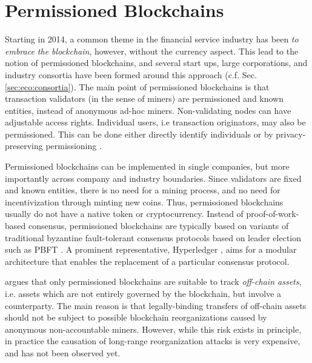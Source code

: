 \section{Permissioned Blockchains}

Starting in 2014, a common theme in the financial service industry has been \emph{to embrace the blockchain}, however, without the currency aspect. This lead to the notion of permissioned blockchains, and several start ups, large corporations, and industry consortia have been formed around this approach (c.f. Sec. \ref{sec:eco:consortia}). The main point of permissioned blockchains is that transaction validators (in the sense of miners) are permissioned and known entities, instead of anonymous ad-hoc miners. Non-validating nodes can have adjustable access rights. Individual users, i.e transaction originators, may also be permissioned. This can be done either directly identify individuals or by privacy-preserving permissioning \parencite{hardjono2016chain,Hardjono:2016:CCC:2899007.2899012}.

Permissioned blockchains can be implemented in single companies, but more importantly across company and industry boundaries. Since validators are fixed and known entities, there is no need for a mining process, and no need for incentivization through minting new coins. Thus, permissioned blockchains usually do not have a native token or cryptocurrency. Instead of proof-of-work-based consensus, permissioned blockchains are typically based on variants of traditional byzantine fault-tolerant consensus protocols based on leader election such as \ac{PBFT} \parencite{castro1999practical}. A prominent representative, Hyperledger \parencite{cachin2016architecture}, aims for a modular architecture that enables the replacement of a particular consensus protocol.

\cite{swanson2015consensus} argues that only permissioned blockchains are suitable to track \emph{off-chain assets}, i.e. assets which are not entirely governed by the blockchain, but involve a counterparty. The main reason is that legally-binding transfers of off-chain assets should not be subject to possible blockchain reorganizations caused by anonymous non-accountable miners. However, while this risk exists in principle, in practice the causation of long-range reorganization attacks is very expensive, and has not been observed yet.

